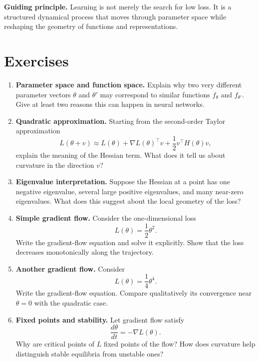 \medskip

\noindent
\textbf{Guiding principle.}
Learning is not merely the search for low loss. It is a structured dynamical process that moves through parameter space while reshaping the geometry of functions and representations.

\section*{Exercises}

\begin{enumerate}
    \item \textbf{Parameter space and function space.}
    Explain why two very different parameter vectors \(\theta\) and \(\theta'\) may correspond to similar functions \(f_\theta\) and \(f_{\theta'}\). Give at least two reasons this can happen in neural networks.

    \item \textbf{Quadratic approximation.}
    Starting from the second-order Taylor approximation
    \[
    L(\theta+v)\approx L(\theta)+\nabla L(\theta)^\top v+\frac12 v^\top H(\theta)v,
    \]
    explain the meaning of the Hessian term. What does it tell us about curvature in the direction \(v\)?

    \item \textbf{Eigenvalue interpretation.}
    Suppose the Hessian at a point has one negative eigenvalue, several large positive eigenvalues, and many near-zero eigenvalues. What does this suggest about the local geometry of the loss?

    \item \textbf{Simple gradient flow.}
    Consider the one-dimensional loss
    \[
    L(\theta)=\frac12 \theta^2.
    \]
    Write the gradient-flow equation and solve it explicitly. Show that the loss decreases monotonically along the trajectory.

    \item \textbf{Another gradient flow.}
    Consider
    \[
    L(\theta)=\frac14 \theta^4.
    \]
    Write the gradient-flow equation. Compare qualitatively its convergence near \(\theta=0\) with the quadratic case.

    \item \textbf{Fixed points and stability.}
    Let gradient flow satisfy
    \[
    \frac{d\theta}{dt}=-\nabla L(\theta).
    \]
    Why are critical points of \(L\) fixed points of the flow? How does curvature help distinguish stable equilibria from unstable ones?


\end{enumerate}
